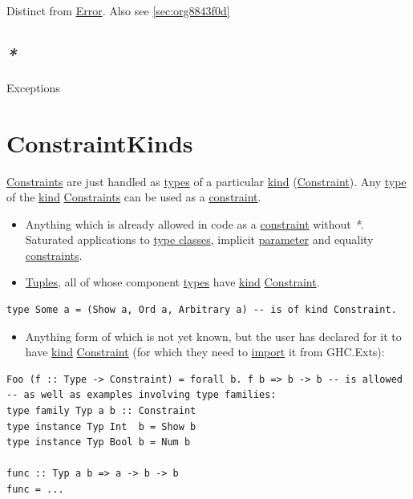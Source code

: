 \documentclass[a4paper,14pt,oneside]{book}
\begin{document}
Distinct from \hyperref[orgb5df5ff]{Error}. Also see \ref{sec:org8843f0d}

\section{\emph{*}}
\label{sec:org35630ef}

\label{org17ad893}Exceptions

\chapter{\label{org80d5921}ConstraintKinds}
\label{sec:org37b0838}
\hyperref[org0c78ed8]{Constraints} are just handled as \hyperref[org4c3b732]{types} of a particular \hyperref[org2c879e2]{kind} (\hyperref[org0297f71]{Constraint}).
Any \hyperref[orgdecb8e8]{type} of the \hyperref[org2c879e2]{kind} \hyperref[org0c78ed8]{Constraints} can be used as a \hyperref[org0297f71]{constraint}.
\begin{itemize}
\item Anything which is already allowed in code as a \hyperref[org0297f71]{constraint} without \emph{*}. Saturated applications to \hyperref[org42f2103]{type classes}, implicit \hyperref[orgc9119d3]{parameter} and equality \hyperref[org0c78ed8]{constraints}.
\item \hyperref[orgbbebaae]{Tuples}, all of whose component \hyperref[org4c3b732]{types} have \hyperref[org2c879e2]{kind} \hyperref[org0297f71]{Constraint}.
\end{itemize}
\begin{verbatim}
type Some a = (Show a, Ord a, Arbitrary a) -- is of kind Constraint.
\end{verbatim}
\begin{itemize}
\item Anything form of which is not yet known, but the user has declared for it to have \hyperref[org2c879e2]{kind} \hyperref[org0297f71]{Constraint} (for which they need to \hyperref[org05c1aec]{import} it from GHC.Exts):
\end{itemize}
\begin{verbatim}
Foo (f :: Type -> Constraint) = forall b. f b => b -> b -- is allowed
-- as well as examples involving type families:
type family Typ a b :: Constraint
type instance Typ Int  b = Show b
type instance Typ Bool b = Num b

func :: Typ a b => a -> b -> b
func = ...
\end{verbatim}
\end{document}
